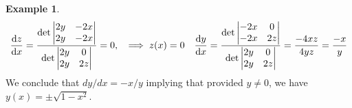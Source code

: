 \documentclass[
	12pt,
	]{article}
\theoremstyle{custom}
\theoremstyle{custom}
\theoremstyle{custom}
\theoremstyle{custom}
\theoremstyle{custom}
\theoremstyle{definition}
\newtheorem{example}{Example}[section]
\theoremstyle{example}
\theoremstyle{note}
\theoremstyle{remark}
\theoremstyle{example}
\newcounter{theo}[section]\setcounter{theo}{0}
\numberwithin{equation}{subsection}
\begin{document}
\begin{example}
\begin{equation*}
	   		 		\dv{z}{x} = \frac{\det 
	   		 		\begin{vmatrix}
	   		 			2y & -2x \\
	   		 			2y & -2x
	   		 		\end{vmatrix}
	   		 		}{\det
	   		 		\begin{vmatrix}
	   		 			2y & 0 \\
	   		 			2y & 2z
	   		 		\end{vmatrix}
	   		 		} = 0 , \ \ \implies z(x) = 0 \quad \dv{y}{x} = \frac{\det
	   		 		\begin{vmatrix}
	   		 			-2x & 0 \\
	   		 			-2x & 2z
	   		 		\end{vmatrix}
	   		 		}{\det
	   		 		\begin{vmatrix}
	   		 			2y & 0 \\
	   		 			2y & 2z
	   		 		\end{vmatrix}
	   		 		} = \frac{-4xz}{4yz} = \frac{-x}{y}
	   		 	\end{equation*}
	   		 We conclude that $dy/dx  = -x/y$ implying that provided $y\neq 0$, we have $y(x) = \pm \sqrt{1-x^{2}}.$ 
	   		 \end{example}
	   		 
\end{document}
